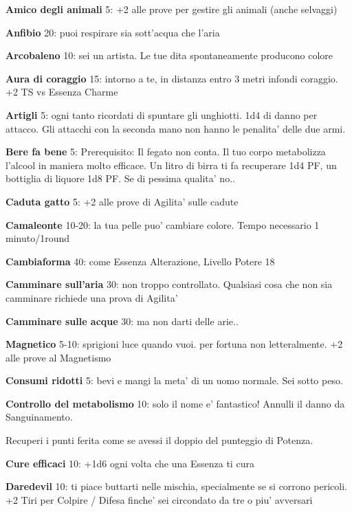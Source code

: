 \documentclass[a4paper,11pt,twoside,openany]{book}
\begin{document}
\textbf{Amico degli animali} 5: +2 alle prove per gestire gli animali (anche selvaggi)

\textbf{Anfibio} 20: puoi respirare sia sott'acqua che l'aria

\textbf{Arcobaleno} 10: sei un artista. Le tue dita spontaneamente
producono colore

\textbf{Aura di coraggio} 15: intorno a te, in distanza entro 3 metri infondi coraggio. +2 TS vs Essenza Charme

\textbf{Artigli} 5: ogni tanto ricordati di spuntare gli unghiotti. 1d4 di danno per attacco. Gli attacchi con la seconda mano non hanno le penalita' delle due armi.

\textbf{Bere fa bene} 5: Prerequisito: Il fegato non conta. Il tuo corpo metabolizza l'alcool in maniera molto efficace. Un litro di birra ti fa recuperare 1d4 PF, un bottiglia di liquore 1d8 PF. Se di pessima qualita' no.. 

\textbf{Caduta gatto} 5: +2 alle prove di Agilita' sulle cadute

\textbf{Camaleonte} 10-20: la tua pelle puo' cambiare colore. Tempo necessario 1 minuto/1round

\textbf{Cambiaforma} 40: come Essenza Alterazione, Livello Potere 18

\textbf{Camminare sull'aria} 30: non troppo controllato. Qualsiasi cosa che non sia camminare richiede una prova di Agilita'

\textbf{Camminare sulle acque}  30: ma non darti delle arie..

\textbf{Magnetico} 5-10: sprigioni luce quando vuoi. per fortuna non letteralmente. +2 alle prove al Magnetismo

\textbf{Consumi ridotti} 5: bevi e mangi la meta' di un uomo normale. Sei sotto peso.

\textbf{Controllo del metabolismo}  10: solo il nome e' fantastico! Annulli il danno da Sanguinamento.

Recuperi i punti ferita come se avessi il doppio del punteggio di Potenza.

\textbf{Cure efficaci} 10: +1d6 ogni volta che una Essenza
ti cura

\textbf{Daredevil} 10: ti piace buttarti nelle mischia, specialmente se si corrono pericoli. +2 Tiri per Colpire / Difesa finche' sei circondato da tre o piu' avversari
\end{document}
